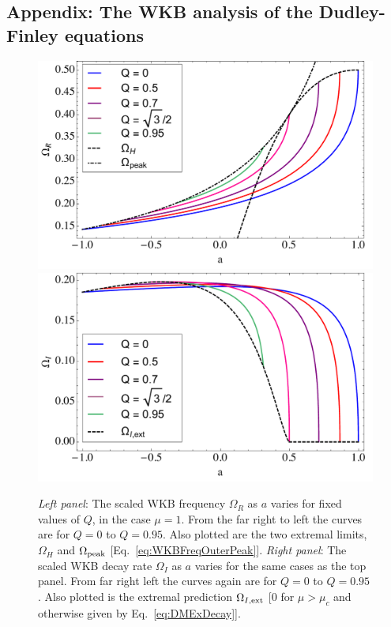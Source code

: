 \begin{refsection}
\section{Appendix: The WKB analysis of the Dudley-Finley equations}
\label{sec:WKBApp}

\begin{figure}[t]
\includegraphics[width = 0.48 \columnwidth]{chapter_extremal/etc/WKBFreqFixQ}
\includegraphics[width = 0.48 \columnwidth]{chapter_extremal/etc/WKBDecayFixQ}
\caption{{\it Left panel}: The scaled WKB frequency $\Omega_R$ as $a$ varies for fixed values of $Q$, in the case $\mu = 1$. From the far right to left the curves are for $Q=0$ to $Q = 0.95$. Also plotted are the two extremal limits, $\Omega_H$ and $\Omega_{\rm peak}$ [Eq.~\eqref{eq:WKBFreqOuterPeak}].
{\it Right panel}: The scaled WKB decay rate $\Omega_I$ as $a$ varies for the same cases as the top panel. From far right left the curves again are for $Q = 0$ to  
$Q = 0.95$. Also plotted is the extremal prediction $\Omega_{I, {\rm ext}}$ [$0$ for $\mu>\mu_c$ and otherwise given by Eq.~\eqref{eq:DMExDecay}].
}
\label{fig:WKBFreqFixQ}
\end{figure}


\end{refsection}
